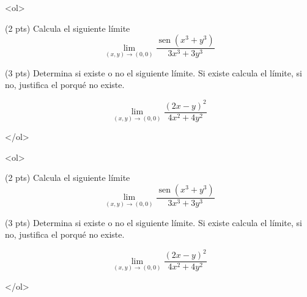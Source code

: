 \documentclass[12pt]{article}
\newcommand{\sen}{\operatorname{sen}}
\begin{document}
\bigskip

            
\bigskip
\bigskip
\bigskip


<ol>

\item (2 pts) Calcula el siguiente  límite
$$
\lim_{(x,y)\to (0,0)} \frac{\sen(x^3+y^3)}{3x^3+3y^3}
$$
  
\vspace{1.5cm}  
  
\item (3 pts) Determina si existe o no el siguiente límite. Si existe calcula el límite,  si no, justifica el porqué no existe.

$$
\lim_{(x,y) \to (0,0)} \frac{(2x-y)^2}{4x^2+4y^2}
$$



  </ol>


  \vspace{2.5cm}
  
  
\bigskip

            
\bigskip
\bigskip
\bigskip


<ol>

\item (2 pts) Calcula el siguiente  límite
$$
\lim_{(x,y)\to (0,0)} \frac{\sen(x^3+y^3)}{3x^3+3y^3}
$$
  
\vspace{1.5cm}  
  
\item (3 pts) Determina si existe o no el siguiente límite. Si existe calcula el límite,  si no, justifica el porqué no existe.

$$
\lim_{(x,y) \to (0,0)} \frac{(2x-y)^2}{4x^2+4y^2}
$$



  </ol>

  
\end{document}
